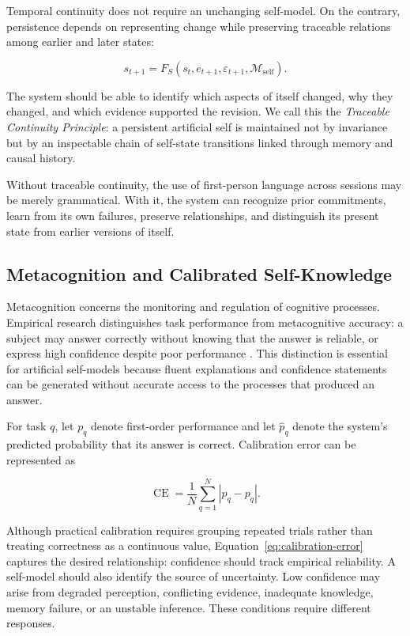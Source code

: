 Temporal continuity does not require an unchanging self-model. On the contrary, persistence depends on representing change while preserving traceable relations among earlier and later states:

\begin{equation}
s_{t+1}
=
F_S
\left(
s_t,
e_{t+1},
\varepsilon_{t+1},
\mathcal{M}_{\mathrm{self}}
\right).
\label{eq:self-update}
\end{equation}

The system should be able to identify which aspects of itself changed, why they changed, and which evidence supported the revision. We call this the \emph{Traceable Continuity Principle}: a persistent artificial self is maintained not by invariance but by an inspectable chain of self-state transitions linked through memory and causal history.

Without traceable continuity, the use of first-person language across sessions may be merely grammatical. With it, the system can recognize prior commitments, learn from its own failures, preserve relationships, and distinguish its present state from earlier versions of itself.

\subsection{Metacognition and Calibrated Self-Knowledge}
\label{subsec:metacognitive-self-knowledge}

Metacognition concerns the monitoring and regulation of cognitive processes. Empirical research distinguishes task performance from metacognitive accuracy: a subject may answer correctly without knowing that the answer is reliable, or express high confidence despite poor performance \cite{fleming2012neural,fleming2014measure}. This distinction is essential for artificial self-models because fluent explanations and confidence statements can be generated without accurate access to the processes that produced an answer.

For task $q$, let $p_q$ denote first-order performance and let $\widehat{p}_q$ denote the system's predicted probability that its answer is correct. Calibration error can be represented as

\begin{equation}
\operatorname{CE}
=
\frac{1}{N}
\sum_{q=1}^{N}
\left|
\widehat{p}_q-p_q
\right|.
\label{eq:calibration-error}
\end{equation}

Although practical calibration requires grouping repeated trials rather than treating correctness as a continuous value, Equation~\ref{eq:calibration-error} captures the desired relationship: confidence should track empirical reliability. A self-model should also identify the source of uncertainty. Low confidence may arise from degraded perception, conflicting evidence, inadequate knowledge, memory failure, or an unstable inference. These conditions require different responses.

